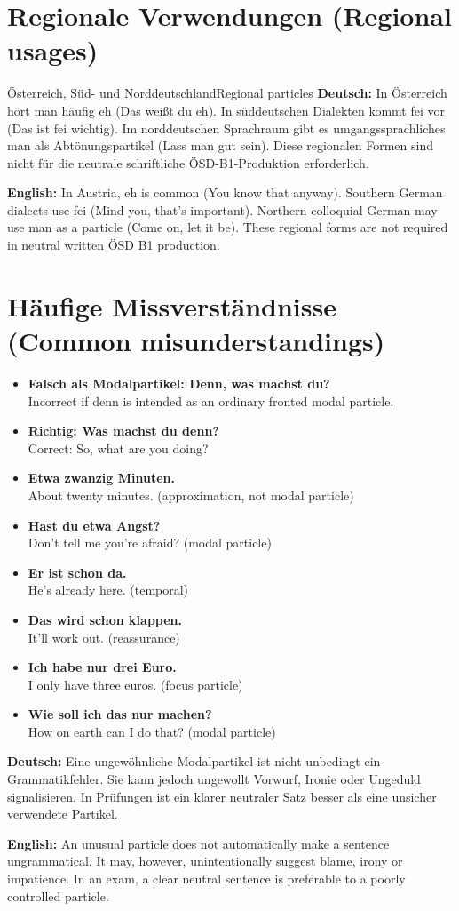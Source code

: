 \documentclass[a4paper,11pt]{article}
\newcommand{\GermanText}[1]{\textbf{Deutsch: }#1\par}
\newcommand{\EnglishText}[1]{{\small\color{SoftGray}\textbf{English: }#1\par}}
\newcommand{\ExampleItem}[2]{\item \textbf{#1}\\{\small\color{SoftGray}#2}}
\begin{document}
\section{Regionale Verwendungen \textnormal{(Regional usages)}}
\begin{grammarentry}{Österreich, Süd- und Norddeutschland}{Regional particles}
\GermanText{In Österreich hört man häufig eh (Das weißt du eh). In süddeutschen Dialekten kommt fei vor (Das ist fei wichtig). Im norddeutschen Sprachraum gibt es umgangssprachliches man als Abtönungspartikel (Lass man gut sein). Diese regionalen Formen sind nicht für die neutrale schriftliche ÖSD-B1-Produktion erforderlich.}
\EnglishText{In Austria, eh is common (You know that anyway). Southern German dialects use fei (Mind you, that's important). Northern colloquial German may use man as a particle (Come on, let it be). These regional forms are not required in neutral written ÖSD B1 production.}
\end{grammarentry}
\section{Häufige Missverständnisse \textnormal{(Common misunderstandings)}}
\begin{exbox}\begin{itemize}
\ExampleItem{Falsch als Modalpartikel: Denn, was machst du?}{Incorrect if denn is intended as an ordinary fronted modal particle.}
\ExampleItem{Richtig: Was machst du denn?}{Correct: So, what are you doing?}
\ExampleItem{Etwa zwanzig Minuten.}{About twenty minutes. (approximation, not modal particle)}
\ExampleItem{Hast du etwa Angst?}{Don't tell me you're afraid? (modal particle)}
\ExampleItem{Er ist schon da.}{He's already here. (temporal)}
\ExampleItem{Das wird schon klappen.}{It'll work out. (reassurance)}
\ExampleItem{Ich habe nur drei Euro.}{I only have three euros. (focus particle)}
\ExampleItem{Wie soll ich das nur machen?}{How on earth can I do that? (modal particle)}
\end{itemize}\end{exbox}
\GermanText{Eine ungewöhnliche Modalpartikel ist nicht unbedingt ein Grammatikfehler. Sie kann jedoch ungewollt Vorwurf, Ironie oder Ungeduld signalisieren. In Prüfungen ist ein klarer neutraler Satz besser als eine unsicher verwendete Partikel.}
\EnglishText{An unusual particle does not automatically make a sentence ungrammatical. It may, however, unintentionally suggest blame, irony or impatience. In an exam, a clear neutral sentence is preferable to a poorly controlled particle.}
\end{document}
